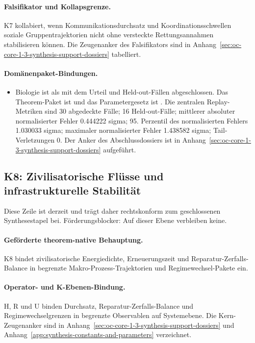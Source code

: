 \paragraph{Falsifikator und Kollapsgrenze.}
K7 kollabiert, wenn Kommunikationsdurchsatz und Koordinationsschwellen soziale Gruppentrajektorien nicht ohne versteckte Rettungsannahmen stabilisieren können.
Die Zeugenanker des Falsifikators sind in Anhang~\ref{sec:oc-core-1-3-synthesis-support-dossiers} tabelliert.

\paragraph{Domänenpaket-Bindungen.}
\begin{itemize}[leftmargin=1.6em,nosep]
\item Biologie ist als  mit dem Urteil  und  Held-out-Fällen abgeschlossen. Das Theorem-Paket ist  und das Parametergesetz ist . Die zentralen Replay-Metriken sind 30 abgedeckte Fälle; 16 Held-out-Fälle; mittlerer absoluter normalisierter Fehler 0.444222 sigma; 95. Perzentil des normalisierten Fehlers 1.030033 sigma; maximaler normalisierter Fehler 1.438582 sigma; Tail-Verletzungen 0. Der Anker des Abschlussdossiers ist in Anhang~\ref{sec:oc-core-1-3-synthesis-support-dossiers} aufgeführt.
\end{itemize}

\subsection{K8: Zivilisatorische Flüsse und infrastrukturelle Stabilität}
\label{sec:oc-core-1-3-synthesis-k8}
Diese Zeile ist derzeit  und trägt daher rechtskonform zum geschlossenen Synthesestapel bei.
Förderungsblocker: Auf dieser Ebene verbleiben keine.

\paragraph{Geförderte theorem-native Behauptung.}
K8 bindet zivilisatorische Energiedichte, Erneuerungszeit und Reparatur-Zerfalls-Balance in begrenzte Makro-Prozess-Trajektorien und Regimewechsel-Pakete ein.

\paragraph{Operator- und K-Ebenen-Bindung.}
H, R und U binden Durchsatz, Reparatur-Zerfalls-Balance und Regimewechselgrenzen in begrenzte Observablen auf Systemebene.
Die Kern-Zeugenanker sind in Anhang~\ref{sec:oc-core-1-3-synthesis-support-dossiers} und Anhang~\ref{app:synthesis-constants-and-parameters} verzeichnet.


